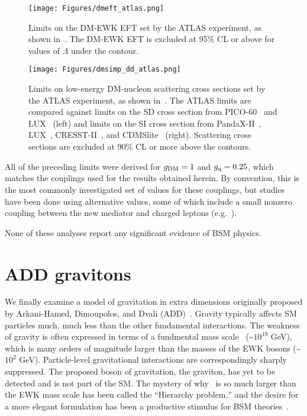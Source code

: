 \begin{figure}[hbtb]
  \begin{center}
    \texttt{[image: Figures/dmeft\_atlas.png]}
    \caption{Limits on the DM-EWK EFT set by the ATLAS experiment, as shown in~\cite{ref:epjc/s10052-017-4965-8}. The DM-EWK EFT is excluded at 95\% CL or above for
    values of $\Lambda$ under the contour.
    }
    \label{fig:dmeft_atlas}
  \end{center}
\end{figure}

\begin{figure}[hbtb]
  \begin{center}
    \texttt{[image: Figures/dmsimp\_dd\_atlas.png]}
    \caption{Limits on low-energy DM-nucleon scattering cross sections set by the ATLAS experiment, as shown in~\cite{ref:epjc/s10052-017-4965-8}. The ATLAS
    limits are compared against limits on the SD cross section from PICO-60~\cite{ref:PICO60-ATLAS} and LUX~\cite{ref:LUX-SD-ATLAS} (left)
    and limits on the SI cross section from PandaX-II~\cite{ref:PANDAX-II-ATLAS}, LUX~\cite{ref:LUX-SI-ATLAS}, CRESST-II~\cite{ref:CRESST-II-ATLAS}, and CDMSlite~\cite{ref:SuperCDMS-ATLAS} (right).
    Scattering cross sections are excluded at 90\% CL or more above the contours.
    }
    \label{fig:dmsimp_dd_atlas}
  \end{center}
\end{figure}

All of the preceding limits were derived for $g_\mathrm{DM} = 1$ and $g_\mathrm{q} = 0.25$, which matches the couplings used for the results obtained herein.
By convention, this is the most commonly investigated set of values for these couplings, but studies have been done using alternative values, some of which
include a small nonzero coupling between the new mediator and charged leptons (e.g.~\cite{ref:epjc/s10052-017-4965-8}).

None of these analyses report any significant evidence of BSM physics.

\section{ADD gravitons} \label{sec:introduction_ADD}
We finally examine a model of gravitation in extra dimensions originally proposed by Arkani-Hamed, Dimoupolos, and Dvali (ADD)~\cite{ref:S0370-2693(98)00466-3}.
Gravity typically affects SM particles much, much less than the other fundamental interactions. The weakness of gravity
is often expressed in terms of a fundmental mass scale \mPl\ (\textasciitilde$10^{19}$ GeV), which is
many orders of magnitude larger than the masses of the EWK bosons (\textasciitilde$10^{2}$ GeV). Particle-level gravitational interactions
are correspondingly sharply suppressed. The proposed boson of gravitation, the graviton, has yet to be detected and is not part of the SM.
The mystery of why \mPl\ is so much larger than the EWK mass scale has been called the ``Hierarchy problem,'' and the desire for a
more elegant formulation has been a productive stimulus for BSM theories~\cite{ref:S0370-2693(98)00466-3, ref:0264-9381/32/3/033001}.

